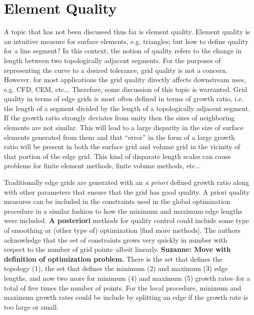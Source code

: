 \section{Element Quality}
A topic that has not been discussed thus far is element quality.  Element 
quality is an intuitive measure for surface elements, e.g. triangles; but 
how to define quality for a line segment?  In this context, the notion of 
quality refers to the change in length between two topologically adjacent 
segments.  For the purposes of representing the curve to a desired 
tolerance, grid quality is not a concern.  However, for most applications 
the grid quality directly affects downstream uses, e.g. CFD, CEM, etc... 
Therefore, some discussion of this topic is warranted.  Grid quality in 
terms of edge grids is most often defined in terms of growth ratio, i.e. 
the length of a segment divided by the length of a topologically adjacent 
segment.  If the growth ratio strongly deviates from unity then the sizes 
of neighboring elements are not similar.  This will lead to a large 
disparity in the size of surface elements generated from them and that 
``error'' in the form of a large growth ratio will be present in both the 
surface grid and volume grid in the vicinity of that portion of the edge 
grid.  This kind of disparate length scales can cause problems for finite 
element methods, finite volume methods, etc...

Traditionally edge grids are generated with an {\it{a priori}} defined 
growth ratio along with other parameters that ensure that the grid has 
good quality.  A priori quality measures can be included in the 
constraints used in the global optimization procedure in a similar fashion 
to how the minimum and maximum edge lengths were included.  
{\bf{A posteriori}} methods for quality control could include some type of 
smoothing or (other type of) optimization [find more methods].  The 
authors acknowledge that the set of constraints grows very quickly in number with respect to the 
number of grid points--albeit linearly.  {\bf{Suzanne:  Move with 
definition of optimization problem.}}  There is the set that defines 
the topology (1), the set that defines the minimum (2) and maximum (3) 
edge lengths, and now two more for minimum (4) and maximum (5) growth 
rates--for a total of five times the number of points.  For the local 
procedure, minimum and maximum growth rates could be include by splitting an edge if 
the growth rate is too large or small.

